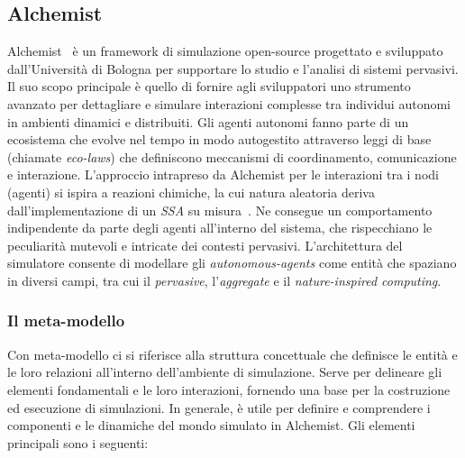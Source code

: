 \subsection{Alchemist}
Alchemist~\cite{Pianini_2013} è un framework di simulazione open-source progettato e sviluppato dall'Università di Bologna per supportare lo studio e l'analisi di sistemi pervasivi.  Il suo scopo principale è quello di fornire agli sviluppatori uno strumento avanzato per dettagliare e simulare interazioni complesse tra individui autonomi in ambienti dinamici e distribuiti. Gli agenti autonomi fanno parte di un ecosistema che evolve nel tempo in modo autogestito attraverso leggi di base (chiamate \textit{eco-laws}) che definiscono meccanismi di coordinamento, comunicazione e interazione. 
L'approccio intrapreso da Alchemist per le interazioni tra i nodi (agenti) si ispira a reazioni chimiche, la cui natura aleatoria deriva dall'implementazione di un \textit{\ac{SSA}} su misura~\cite{PMV2011}. Ne consegue  un comportamento indipendente da parte degli agenti all'interno del sistema, che rispecchiano le peculiarità mutevoli e intricate dei contesti pervasivi.
L'architettura del simulatore consente di modellare gli \textit{autonomous-agents} come entità che spaziano in diversi campi, tra cui il \textit{pervasive}, l'\textit{aggregate} e il \textit{nature-inspired computing}.

\subsubsection{Il meta-modello}
Con meta-modello ci si riferisce alla struttura concettuale che definisce le entità e le loro relazioni all'interno dell'ambiente di simulazione. Serve per delineare gli elementi fondamentali e le loro interazioni, fornendo una base per la costruzione ed esecuzione di simulazioni. In generale, è utile per definire e comprendere i componenti e le dinamiche del mondo simulato in Alchemist. Gli elementi principali sono i seguenti:

